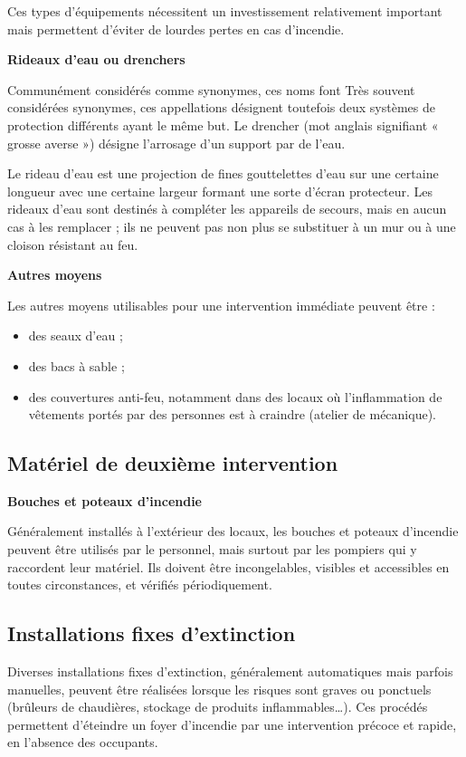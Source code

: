 Ces types d’équipements nécessitent un investissement relativement important mais permettent d’éviter de lourdes pertes en cas d’incendie.


\vspace{0.3cm}
\textbf{Rideaux d'eau ou drenchers}
\vspace{0.3cm}

Communément considérés comme synonymes, ces noms font Très souvent considérées synonymes, ces appellations désignent toutefois deux systèmes de protection différents ayant le même but. 
Le drencher (mot anglais signifiant « grosse averse ») désigne l’arrosage d’un support par de l’eau. 
\vspace{0.3cm}

Le rideau d’eau est une projection de fines gouttelettes d’eau sur une certaine longueur avec une certaine largeur formant une sorte d’écran protecteur. Les rideaux d’eau sont destinés à compléter les appareils de secours, mais en aucun cas à les remplacer ; ils ne peuvent pas non plus se substituer à un mur ou à une cloison résistant au feu.

\newpage
\vspace{0.3cm}
\textbf{Autres moyens}
\vspace{0.3cm}

Les autres moyens utilisables pour une intervention immédiate peuvent être :

\begin{itemize}
\item  des seaux d’eau ;
\item  des bacs à sable ;
\item  des couvertures anti-feu, notamment dans des locaux où l’inflammation de vêtements portés par des personnes est à craindre (atelier de mécanique).

\end{itemize}


\subsection{Matériel de deuxième intervention}


\textbf{Bouches et poteaux d’incendie}
\vspace{0.3cm}

Généralement installés à l’extérieur des locaux, les bouches et poteaux d’incendie peuvent être utilisés par le personnel, mais surtout par les pompiers qui y raccordent leur matériel. Ils doivent être incongelables, visibles et accessibles en toutes circonstances, et vérifiés périodiquement.



\subsection{Installations fixes d’extinction}


Diverses installations fixes d’extinction, généralement automatiques mais parfois manuelles, peuvent être réalisées lorsque les risques sont graves ou ponctuels (brûleurs de chaudières, stockage de produits inflammables…). Ces procédés permettent d’éteindre un foyer d’incendie par une intervention précoce et rapide, en l’absence des occupants.
